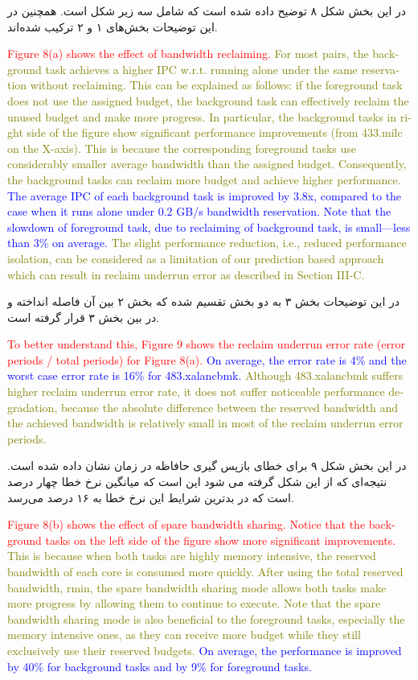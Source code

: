 \documentclass[a4paper, 11pt]{article}
\begin{document}
در این بخش شکل ۸ توضیح داده شده است که شامل سه زیر شکل است. همچنین در این توضیحات
بخش‌های ۱ و ۲ ترکیب شده‌اند.
\begin{latin}
\textcolor{red}{Figure 8(a) shows the effect of bandwidth reclaiming.}
\textcolor{olive}{For
most pairs, the background task achieves a higher IPC w.r.t.
running alone under the same reservation without reclaiming.
This can be explained as follows: if the foreground task does
not use the assigned budget, the background task can effectively reclaim the unused budget and make more progress. In
particular, the background tasks in right side of the figure show
significant performance improvements (from 433.milc on the
X-axis). This is because the corresponding foreground tasks
use considerably smaller average bandwidth than the assigned
budget. Consequently, the background tasks can reclaim more
budget and achieve higher performance.}
\textcolor{blue}{The average IPC of
each background task is improved by 3.8x, compared to the
case when it runs alone under 0.2 GB/s bandwidth reservation.
Note that the slowdown of foreground task, due to reclaiming
of background task, is small—less than 3\% on average.}
\textcolor{olive}{The slight performance reduction, i.e., reduced performance
isolation, can be considered as a limitation of our prediction
based approach which can result in reclaim underrun error as
described in Section III-C.}
\end{latin}
در این توضیحات بخش ۳ به دو بخش تقسیم شده که بخش ۲ بین‌ آن فاصله انداخته و در بین بخش
۳ قرار گرفته است.
\begin{latin}
\textcolor{red}{To better understand this, Figure 9
shows the reclaim underrun error rate (error periods / total
periods) for Figure 8(a).}
\textcolor{blue}{On average, the error rate is 4\% and
the worst case error rate is 16\% for 483.xalancbmk.}
\textcolor{olive}{Although
483.xalancbmk suffers higher reclaim underrun error rate, it
does not suffer noticeable performance degradation, because
the absolute difference between the reserved bandwidth and
the achieved bandwidth is relatively small in most of the
reclaim underrun error periods.}
\end{latin}
در این بخش شکل ۹ برای خطای بازپس گیری حافاظه در زمان
نشان داده شده است. نتیجه‌ای که از این شکل گرفته می شود این است که میانگین نرخ خطا
چهار درصد است که در بدترین شرایط این نرخ خطا به ۱۶ درصد می‌رسد.
\begin{latin}
\textcolor{red}{Figure 8(b) shows the effect of spare bandwidth sharing.
Notice that the background tasks on the left side of the figure
show more significant improvements.}
\textcolor{olive}{This is because when
both tasks are highly memory intensive, the reserved bandwidth of each core is consumed more quickly. After using the
total reserved bandwidth, rmin, the spare bandwidth sharing
mode allows both tasks make more progress by allowing them
to continue to execute. Note that the spare bandwidth sharing
mode is also beneficial to the foreground tasks, especially the
memory intensive ones, as they can receive more budget while
they still exclusively use their reserved budgets.}
\textcolor{blue}{On average,
the performance is improved by 40\% for background tasks
and by 9\% for foreground tasks.}
\end{latin}
\end{document}
